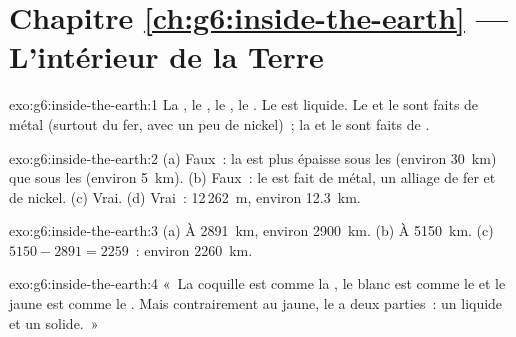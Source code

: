 \section*{Chapitre \ref{ch:g6:inside-the-earth} --- L'intérieur de la Terre}

\begin{solution}{exo:g6:inside-the-earth:1}
La , le , le , le . Le  est liquide. Le  et le  sont faits de
métal (surtout du fer, avec un peu de nickel)~; la  et le 
sont faits de .
\end{solution}

\begin{solution}{exo:g6:inside-the-earth:2}
(a) Faux~: la  est plus épaisse sous les  (environ 30~km)
que sous les  (environ 5~km). (b) Faux~: le  est fait de métal,
un alliage de fer et de nickel. (c) Vrai. (d) Vrai~: 12\,262~m, environ
12.3~km.
\end{solution}

\begin{solution}{exo:g6:inside-the-earth:3}
(a) À 2891~km, environ 2900~km. (b) À 5150~km. (c) $5150 - 2891 = 2259$~:
environ 2260~km.
\end{solution}

\begin{solution}{exo:g6:inside-the-earth:4}
«~La coquille est comme la \underline{}, le blanc est comme le
\underline{} et le jaune est comme le \underline{}. Mais
contrairement au jaune, le \underline{} a deux parties~: un
\underline{} liquide et un \underline{}
solide.~»
\end{solution}


